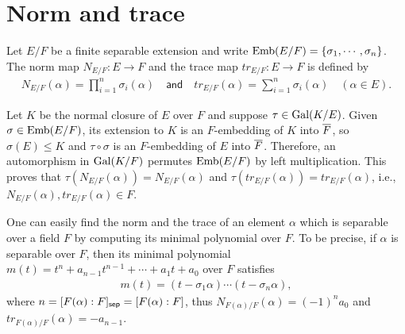 \section{Norm and trace}

\begin{defi}
    Let $E/F$ be a finite separable extension and write ${\textrm{Emb}({E/F})}=\{\sigma_1, \cdots, \sigma_n\}$.
    The norm map $N_{E/F}: E\rightarrow F$ and the trace map $tr_{E/F}: E\rightarrow F$ is defined by
    \begin{align*}
        N_{E/F}(\alpha)=\prod_{i=1}^n \sigma_i(\alpha)\quad\textsf{and}\quad
        tr_{E/F}(\alpha)=\sum_{i=1}^n \sigma_i(\alpha)\quad(\alpha\in E).
    \end{align*}
\end{defi}
\begin{rmk}
    Let $K$ be the normal closure of $E$ over $F$ and suppose $\tau\in{\textrm{Gal}({K/E})}$.
    Given $\sigma\in{\textrm{Emb}({E/F})}$, its extension to $K$ is an $F$-embedding of $K$ into $\overline{F}$, so $\sigma(E)\leq K$ and $\tau\circ\sigma$ is an $F$-embedding of $E$ into $\overline{F}$.
    Therefore, an automorphism in ${\textrm{Gal}({K/F})}$ permutes ${\textrm{Emb}({E/F})}$ by left multiplication.
    This proves that $\tau(N_{E/F}(\alpha))=N_{E/F}(\alpha)$ and $\tau(tr_{E/F}(\alpha))=tr_{E/F}(\alpha)$, i.e., $N_{E/F}(\alpha), tr_{E/F}(\alpha)\in F$.
\end{rmk}
\begin{obs}
    One can easily find the norm and the trace of an element $\alpha$ which is separable over a field $F$ by computing its minimal polynomial over $F$.
    To be precise, if $\alpha$ is separable over $F$, then its minimal polynomial $m(t)=t^n+a_{n-1}t^{n-1}+\cdots+a_1t+a_0$ over $F$ satisfies
    \begin{align*}
        m(t)=(t-\sigma_1\alpha)\cdots(t-\sigma_n\alpha),
    \end{align*}
    where $n=[F(\alpha): F]_{\textsf{sep}}=[F(\alpha): F]$, thus $N_{F(\alpha)/F}(\alpha)=(-1)^n a_0$ and $tr_{F(\alpha)/F}(\alpha)=-a_{n-1}$.
\end{obs}

